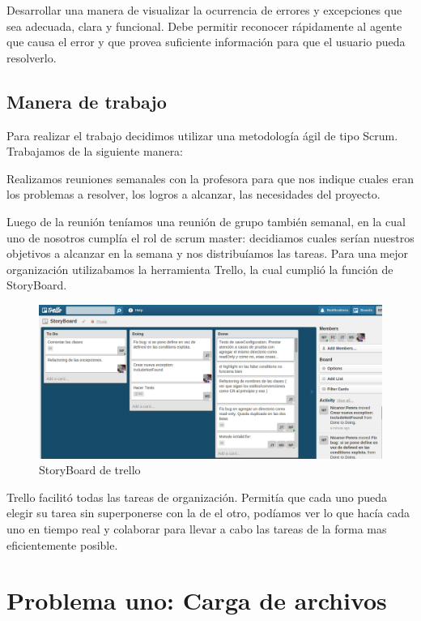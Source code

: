 \documentclass[a4paper,oneside,10pt]{article}
\begin{document}
Desarrollar una manera de visualizar la ocurrencia de errores y excepciones que sea adecuada, clara y funcional. Debe permitir reconocer r\'apidamente al agente que causa el error y que provea suficiente informaci\'on para que el usuario pueda resolverlo.

\subsection{Manera de trabajo}

Para realizar el trabajo decidimos utilizar una metodología \'agil de tipo Scrum. Trabajamos de la siguiente manera: 

Realizamos reuniones semanales con la profesora para que nos indique cuales eran los problemas a resolver, los logros a alcanzar, las necesidades del proyecto.

Luego de la reunión teníamos una reunión de grupo también semanal, en la cual uno de nosotros cumplía el rol de scrum master: decidiamos cuales serían nuestros objetivos a alcanzar en la semana y nos distribuíamos las tareas. Para una mejor organización utilizabamos la herramienta Trello, la cual cumplió la función de StoryBoard.

\begin{figure}[h!]
  \centering
    \includegraphics[scale=0.27]{images/trello.png}
    \caption{StoryBoard de trello}
\end{figure}


Trello facilitó todas las tareas de organización. Permitía que cada uno pueda elegir su tarea sin superponerse con la de el otro, podíamos ver lo que hacía cada uno en tiempo real y colaborar para llevar a cabo las tareas de la forma mas eficientemente posible. 



\section{Problema uno: Carga de archivos}
\end{document}
